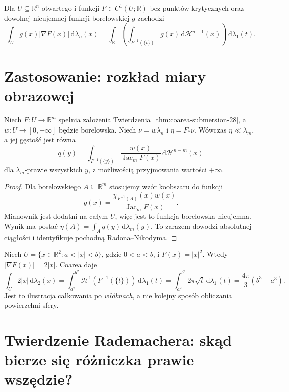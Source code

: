 \begin{wniosek}
\label{cor:coarea-level-28}
Dla $U\subseteq\mathbb R^n$ otwartego i
funkcji $F\in C^1(U;\mathbb R)$
bez punktów krytycznych oraz dowolnej
nieujemnej funkcji borelowskiej $g$ zachodzi
\[
 \int_U g(x)|\nabla F(x)|\,\mathrm d\lambda_n(x)
 =\int_{\mathbb R}\left(\int_{F^{-1}(\{t\})}
 g(x)\,\mathrm d\mathcal H^{n-1}(x)\right)
 \,\mathrm d\lambda_1(t).
\]
\end{wniosek}

\section{Zastosowanie: rozkład miary obrazowej}
\begin{twierdzenie}
\label{thm:pushforward-coarea-28}
Niech $F:U\to\mathbb R^m$ spełnia założenia
Twierdzenia~\ref{thm:coarea-submersion-28},
a $w:U\to[0,+\infty]$ będzie borelowska.
Niech $\nu=w\lambda_n$ i $\eta=F_*\nu$.
Wówczas $\eta\ll\lambda_m$, a jej gęstość jest
równa
\[
 q(y)=\int_{F^{-1}(\{y\})}
 \frac{w(x)}{\operatorname{Jac}_mF(x)}
 \,\mathrm d\mathcal H^{n-m}(x)
\]
dla $\lambda_m$-prawie wszystkich $y$,
z możliwością przyjmowania wartości $+\infty$.
\end{twierdzenie}
\begin{proof}
Dla borelowskiego $A\subseteq\mathbb R^m$
stosujemy wzór koobszaru do funkcji
\[
 g(x)=\frac{\chi_{F^{-1}(A)}(x)w(x)}
 {\operatorname{Jac}_mF(x)}.
\]
Mianownik jest dodatni na całym $U$, więc
jest to funkcja borelowska nieujemna.
Wynik ma postać
$\eta(A)=\int_A q(y)\,\mathrm d\lambda_m(y)$.
To zarazem dowodzi absolutnej ciągłości
i identyfikuje pochodną Radona--Nikodyma.
\end{proof}

\begin{przyklad}
Niech $U=\{x\in\mathbb R^2:a<|x|<b\}$,
gdzie $0<a<b$, i $F(x)=|x|^2$.
Wtedy $|\nabla F(x)|=2|x|$. Coarea daje
\[
 \int_U 2|x|\,\mathrm d\lambda_2(x)
 =\int_{a^2}^{b^2}\mathcal H^1(F^{-1}(\{t\}))
 \,\mathrm d\lambda_1(t)
 =\int_{a^2}^{b^2}2\pi\sqrt t\,\mathrm d\lambda_1(t)
 =\frac{4\pi}{3}(b^3-a^3).
\]
Jest to ilustracja całkowania po \emph{włóknach},
a nie kolejny sposób obliczania powierzchni sfery.
\end{przyklad}


\section{Twierdzenie Rademachera: skąd bierze się różniczka prawie wszędzie?}
\label{sec:rademacher-28}

